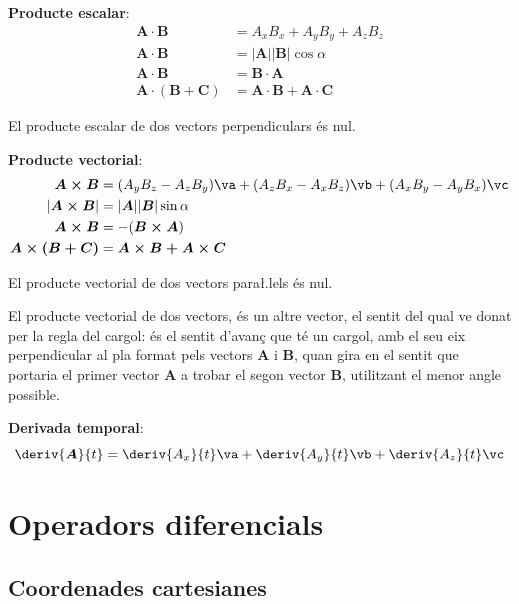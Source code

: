 \documentclass[catalan,a4paper,twoside,11pt]{article}
\begin{document}
\textbf{Producte escalar}:
\begin{align}
    \boldsymbol{A\cdot B} &= A_x B_x + A_y B_y + A_z B_z\\
    \boldsymbol{A\cdot B} &=|\boldsymbol{A}| |\boldsymbol{B}| \cos\alpha\\
    \boldsymbol{A\cdot B} &=\boldsymbol{B\cdot A}\\
    \boldsymbol{A\cdot(B+C)} &= \boldsymbol{A\cdot B+ A\cdot C}
\end{align}

El producte escalar de dos vectors perpendiculars  \'{e}s nul.

\textbf{Producte vectorial}:
\begin{align}
    \boldsymbol{A\times B} &= (A_y B_z - A_z B_y)\va + (A_z B_x - A_x B_z)\vb +
    (A_x B_y - A_y B_x)\vc \\
    |\boldsymbol{A\times B}| &=|\boldsymbol{A}| |\boldsymbol{B}| \sin\alpha\\
    \boldsymbol{A\times B} &=-(\boldsymbol{B\times A})\\
    \boldsymbol{A\times(B+C)} &= \boldsymbol{A\times B+ A\times C}
\end{align}

El producte vectorial de dos vectors para{\l.l}els  \'{e}s nul.

El producte vectorial de dos vectors, \'{e}s un altre vector, el
sentit del qual ve donat per la regla del cargol: \'{e}s el sentit
d'avan\c{c} que t\'{e} un cargol, amb el seu eix perpendicular al
pla format pels vectors  $\boldsymbol{A}$ i $\boldsymbol{B}$, quan
gira en el sentit que portaria el primer vector  $\boldsymbol{A}$ a
trobar el segon vector $\boldsymbol{B}$, utilitzant el menor angle
possible.

\textbf{Derivada temporal}:
\begin{equation}
    \deriv{\boldsymbol{A}}{t} = \deriv{A_x}{t}\va +
    \deriv{A_y}{t}\vb + \deriv{A_z}{t}\vc
\end{equation}


\section{Operadors diferencials }

\subsection{Coordenades cartesianes}
\end{document}
